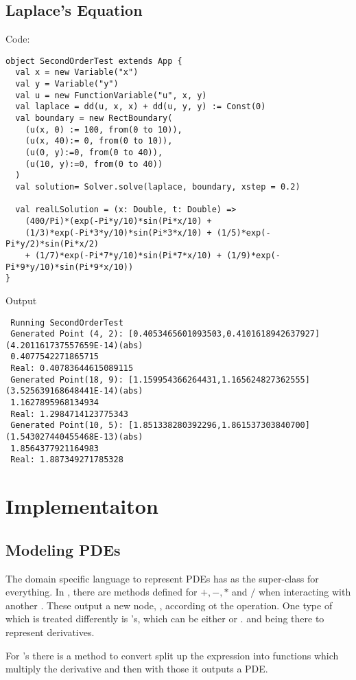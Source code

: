 \subsection{Laplace's Equation}
Code:
\begin{verbatim}
object SecondOrderTest extends App {
  val x = new Variable("x")
  val y = Variable("y")
  val u = new FunctionVariable("u", x, y)
  val laplace = dd(u, x, x) + dd(u, y, y) := Const(0)
  val boundary = new RectBoundary(
    (u(x, 0) := 100, from(0 to 10)),
    (u(x, 40):= 0, from(0 to 10)),
    (u(0, y):=0, from(0 to 40)),
    (u(10, y):=0, from(0 to 40))
  )
  val solution= Solver.solve(laplace, boundary, xstep = 0.2)

  val realLSolution = (x: Double, t: Double) =>
    (400/Pi)*(exp(-Pi*y/10)*sin(Pi*x/10) +
    (1/3)*exp(-Pi*3*y/10)*sin(Pi*3*x/10) + (1/5)*exp(-Pi*y/2)*sin(Pi*x/2)
    + (1/7)*exp(-Pi*7*y/10)*sin(Pi*7*x/10) + (1/9)*exp(-Pi*9*y/10)*sin(Pi*9*x/10))
}
\end{verbatim}
Output
\begingroup
\fontsize{10pt}{12pt}
\begin{verbatim}
 Running SecondOrderTest
 Generated Point (4, 2): [0.4053465601093503,0.4101618942637927]  (4.201161737557659E-14)(abs)
 0.4077542271865715
 Real: 0.40783644615089115
 Generated Point(18, 9): [1.159954366264431,1.165624827362555]  (3.525639168648441E-14)(abs)
 1.1627895968134934
 Real: 1.2984714123775343
 Generated Point(10, 5): [1.851338280392296,1.861537303840700]  (1.543027440455468E-13)(abs)
 1.8564377921164983
 Real: 1.887349271785328
\end{verbatim}
\endgroup
\section{Implementaiton}
\subsection{Modeling PDEs}
The domain specific language to represent PDEs has 
as the super-class for everything. In , there are
methods defined for $+, -, *$ and $/$ when interacting with another
.  These output a new node, , according ot the operation. One type of 
which is treated differently is 's, which can
be either  or .  and
 being there to represent derivatives.

For 's there is a method \verba{:=} to convert split
up the expression into functions which multiply the derivative and
then with those it outputs a PDE.

